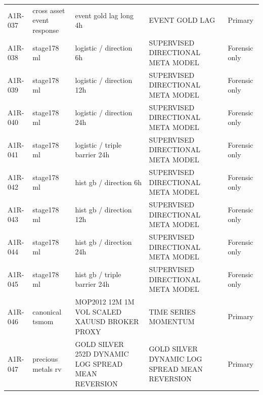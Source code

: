 \begin{longtable}{P{1.1cm}P{1.9cm}P{3.7cm}P{3.1cm}P{1.5cm}}
A1R-037 & cross asset event response & event gold lag long 4h & EVENT GOLD LAG & Primary \\
A1R-038 & stage178 ml & logistic / direction 6h & SUPERVISED DIRECTIONAL META MODEL & Forensic only \\
A1R-039 & stage178 ml & logistic / direction 12h & SUPERVISED DIRECTIONAL META MODEL & Forensic only \\
A1R-040 & stage178 ml & logistic / direction 24h & SUPERVISED DIRECTIONAL META MODEL & Forensic only \\
A1R-041 & stage178 ml & logistic / triple barrier 24h & SUPERVISED DIRECTIONAL META MODEL & Forensic only \\
A1R-042 & stage178 ml & hist gb / direction 6h & SUPERVISED DIRECTIONAL META MODEL & Forensic only \\
A1R-043 & stage178 ml & hist gb / direction 12h & SUPERVISED DIRECTIONAL META MODEL & Forensic only \\
A1R-044 & stage178 ml & hist gb / direction 24h & SUPERVISED DIRECTIONAL META MODEL & Forensic only \\
A1R-045 & stage178 ml & hist gb / triple barrier 24h & SUPERVISED DIRECTIONAL META MODEL & Forensic only \\
A1R-046 & canonical tsmom & MOP2012 12M 1M VOL SCALED XAUUSD BROKER PROXY & TIME SERIES MOMENTUM & Primary \\
A1R-047 & precious metals rv & GOLD SILVER 252D DYNAMIC LOG SPREAD MEAN REVERSION & GOLD SILVER DYNAMIC LOG SPREAD MEAN REVERSION & Primary \\
\bottomrule
\end{longtable}
\endgroup
